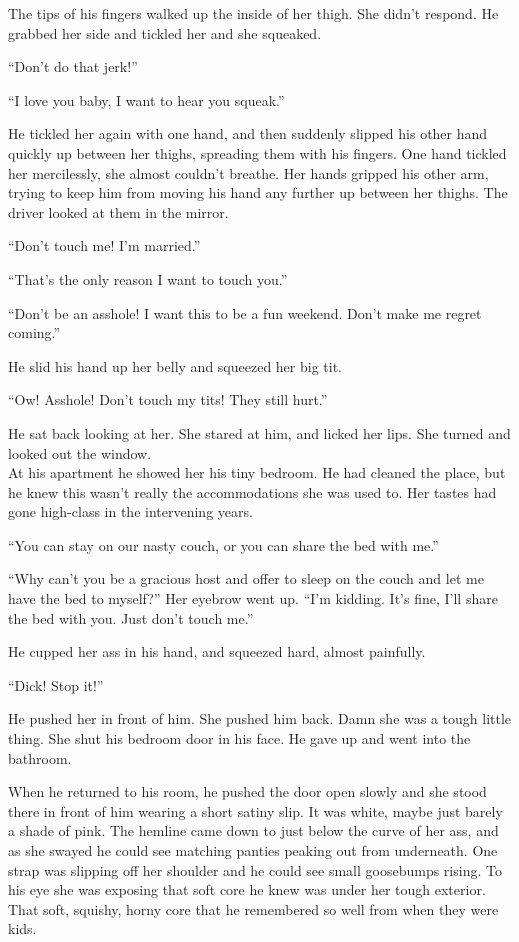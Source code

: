 \documentclass[letterpaper]{article}
\begin{document}
The tips of his fingers walked up the inside of her thigh. She didn't respond. He grabbed her side and tickled her and she squeaked.

``Don't do that jerk!''

``I love you baby, I want to hear you squeak.''

He tickled her again with one hand, and then suddenly slipped his other hand quickly up between her thighs, spreading them with his fingers.
One hand tickled her mercilessly, she almost couldn't breathe. Her hands gripped his other arm, trying to keep him from moving his hand any further up between her thighs.
The driver looked at them in the mirror.

``Don't touch me! I'm married.''

``That's the only reason I want to touch you.''

``Don't be an asshole! I want this to be a fun weekend. Don't make me regret coming.''

He slid his hand up her belly and squeezed her big tit.

``Ow! Asshole! Don't touch my tits! They still hurt.''

He sat back looking at her. She stared at him, and licked her lips. She turned and looked out the window.\\

At his apartment he showed her his tiny bedroom. He had cleaned the place, but he knew this wasn't really the accommodations she was used to. Her tastes had gone high-class in the intervening years.

``You can stay on our nasty couch, or you can share the bed with me.''

``Why can't you be a gracious host and offer to sleep on the couch and let me have the bed to myself?'' Her eyebrow went up. ``I'm kidding. It's fine, I'll share the bed with you. Just don't touch me.''

He cupped her ass in his hand, and squeezed hard, almost painfully.

``Dick! Stop it!''

He pushed her in front of him. She pushed him back. Damn she was a tough little thing. She shut his bedroom door in his face.
He gave up and went into the bathroom.

When he returned to his room, he pushed the door open slowly and she stood there in front of him wearing a short satiny slip. It was white, maybe just barely a shade of pink.
The hemline came down to just below the curve of her ass, and as she swayed he could see matching panties peaking out from underneath.
One strap was slipping off her shoulder and he could see small goosebumps rising. To his eye she was exposing that soft core he knew was under her tough exterior. 
That soft, squishy, horny core that he remembered so well from when they were kids.
\end{document}
